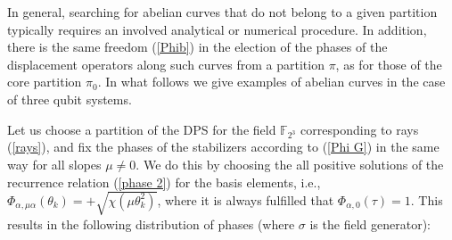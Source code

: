\documentclass[quantumrep,article,submit,pdftex,moreauthors]{Definitions/mdpi}
\begin{document}
In general, searching for abelian curves that do not belong to a given partition
typically requires an involved analytical or numerical procedure.  In addition,
there is the same freedom (\ref{Phib}) in the election of the phases of the
displacement operators along such curves from a partition $\pi$, as for those
of the core partition $\pi_{0}$. In what follows we give examples of abelian
curves in the case of three qubit systems.

Let us choose a partition of the DPS for the field $\mathbb{F}_{2^{3}}$
corresponding to rays (\ref{rays}), and fix the phases of the stabilizers
according to (\ref{Phi G}) in the same way for all slopes $\mu \neq 0$. We do
this by choosing the all positive solutions of the recurrence relation
(\ref{phase 2}) for the basis elements, i.e.,
$\Phi_{\alpha,\mu\alpha}(\theta_{k})=+\sqrt{\chi\left(\mu\theta_{k}^{2}\right)}$,
where it is always fulfilled that $\Phi_{\alpha,0}(\tau)=1$. This results in
the following distribution of phases (where $\sigma$ is the field generator):
\end{document}
